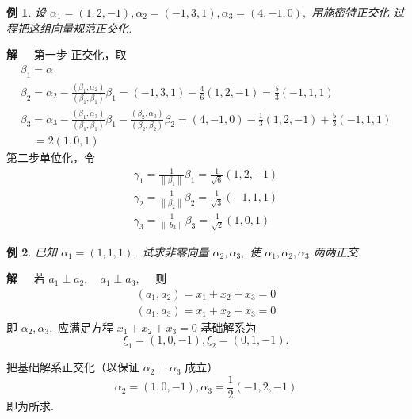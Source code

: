 \documentclass[13pt]{beamer}
\newtheorem{exa}{例}
\def\sol{{\bf 解~~ }}
\def\a{\alpha}
\def\b{\beta}
\def\r{\gamma}
\begin{document}
\begin{frame}
\begin{exa}
设 ${\a}_{1}=\left({1}, {2},  {-1}\right), {\a}_{2}=\left( {- 1},  {3}, {1}\right), {\a}_{3}=\left({4}, {- 1},  {0}\right),$ 用施密特正交化
过程把这组向量规范正交化.
\end{exa}
\sol 第一步 正交化，取
\[\begin{array}{l}
\b_{1}  =\a_{1}\\
\b_{2}  =\a_{2}-\frac{\left(\b_{1}, \a_{2}\right)}{\left(\b_{1}, \b_{1}\right)} \b_{1}=\left( -1,  3, 1\right)-\frac{4}{6}\left(1, 2, -1\right)=\frac{5}{3}\left(-1, 1, 1\right)\\
{\b}_{3}  ={\a}_{3}-\frac{\left({\b}_{1}, {\a}_{3}\right)}{\left({\b}_{1}, {\b}_{1}\right)} {\b}_{1}-\frac{\left({\b}_{2}, {\a}_{3}\right)}{\left({\b}_{2}, {\b}_{2}\right)} {\b}_{2}=\left({4},  -{1}, {0}\right)-\frac{{1}}{{3}}\left({1}, {2}, {- 1}\right)+\frac{{5}}{{3}}\left({- 1}, {1}, {1}\right)\\
\, \quad ={2}\left({1}, {0}, {1}\right)
\end{array}\]
第二步单位化，令
\[\begin{array}{l}
\r_{1}=\frac{1}{\left\| \b_{1}\right\|} \b_{1}=\frac{1}{\sqrt{6}}\left(1, 2, -1\right)\\
\r_{2}=\frac{1}{\left\| \b_{2}\right\|} \b_{2}=\frac{1}{\sqrt{3}}\left(-1, 1,  1\right)\\
\r_{3}=\frac{1}{\left\| \ b_{3}\right\|} \b_{3}=\frac{1}{\sqrt{2}}\left(1, 0,  1\right)
\end{array}\]
\end{frame}


\begin{frame}
\begin{exa}
已知 $\a_{1}=\left( {1}, {1}, {1}\right),$ 试求非零向量 $\a_{2}, \a_{3},$ 使 $\a_{1}, \a_{2}, \a_{3}$ 两两正交.
\end{exa} 
\sol 若 $a_{1} \perp a_{2}, \quad a_{1} \perp a_{3}, \quad$ 则
\[
\begin{array}{l}
{\left(a_{1}, a_{2}\right)=x_{1}+x_{2}+x_{3}=0} \\
{\left(a_{1}, a_{3}\right)=x_{1}+x_{2}+x_{3}=0}
\end{array}
\]
即 $\a_{2}, \a_{3},$ 应满足方程 $x_{1}+x_{2}+x_{3}=0$
基础解系为 $$\xi_{1}=\left( 1, 0, -1 \right), \xi_{2}=\left(0, 1, -1\right).$$

把基础解系正交化（以保证 $\a_{2} \perp \a_{3}$ 成立）
$$\a_{2}=\left( 1,  0,  -1\right), \a_{3}=\frac{1}{2}\left(-1, 2, -1\right)$$
 即为所求.
\end{frame}
\end{document}
